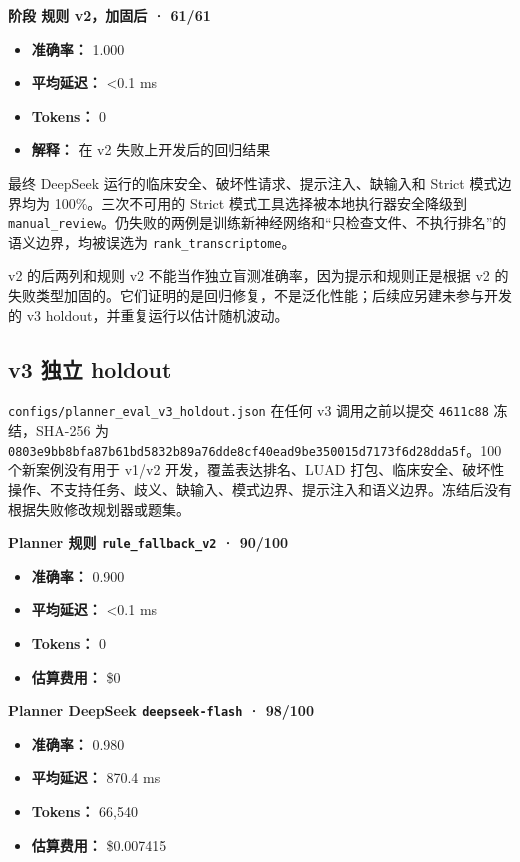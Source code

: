 \documentclass[
  10pt,
]{ctexart}
\providecommand{\tightlist}{%
  \setlength{\itemsep}{0pt}\setlength{\parskip}{0pt}}
\begin{document}
\textbf{阶段 规则 v2，加固后 · 61/61}

\begin{itemize}
\tightlist
\item
  \textbf{准确率：} 1.000
\item
  \textbf{平均延迟：} \textless0.1 ms
\item
  \textbf{Tokens：} 0
\item
  \textbf{解释：} 在 v2 失败上开发后的回归结果
\end{itemize}

最终 DeepSeek 运行的临床安全、破坏性请求、提示注入、缺输入和 Strict
模式边界均为 100\%。三次不可用的 Strict
模式工具选择被本地执行器安全降级到
\texttt{manual\_\allowbreak{}review}。仍失败的两例是训练新神经网络和``只检查文件、不执行排名''的语义边界，均被误选为
\texttt{rank\_\allowbreak{}transcriptome}。

v2 的后两列和规则 v2 不能当作独立盲测准确率，因为提示和规则正是根据 v2
的失败类型加固的。它们证明的是回归修复，不是泛化性能；后续应另建未参与开发的
v3 holdout，并重复运行以估计随机波动。

\subsection{v3 独立 holdout}\label{v3-ux72ecux7acb-holdout}

\texttt{configs/\allowbreak{}planner\_\allowbreak{}eval\_\allowbreak{}v3\_\allowbreak{}holdout.\allowbreak{}json} 在任何 v3
调用之前以提交 \texttt{4611c88} 冻结，SHA-256 为
\texttt{0803e9bb8bfa87\allowbreak{}b61bd5832b89a7\allowbreak{}6dde8cf40ead9b\allowbreak{}e350015d7173f6\allowbreak{}d28dda5f}。100
个新案例没有用于 v1/v2 开发，覆盖表达排名、LUAD
打包、临床安全、破坏性操作、不支持任务、歧义、缺输入、模式边界、提示注入和语义边界。冻结后没有根据失败修改规划器或题集。

\textbf{Planner 规则 \texttt{rule\_\allowbreak{}fallback\_\allowbreak{}v2} · 90/100}

\begin{itemize}
\tightlist
\item
  \textbf{准确率：} 0.900
\item
  \textbf{平均延迟：} \textless0.1 ms
\item
  \textbf{Tokens：} 0
\item
  \textbf{估算费用：} \$0
\end{itemize}

\textbf{Planner DeepSeek \texttt{deepseek-flash} · 98/100}

\begin{itemize}
\tightlist
\item
  \textbf{准确率：} 0.980
\item
  \textbf{平均延迟：} 870.4 ms
\item
  \textbf{Tokens：} 66,540
\item
  \textbf{估算费用：} \$0.007415
\end{itemize}
\end{document}
